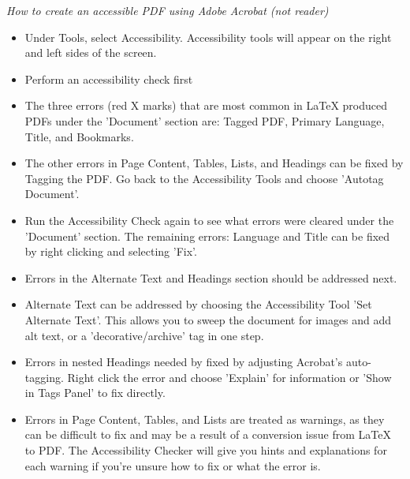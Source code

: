 \begin{titlepage}
\emph{How to create an accessible PDF using Adobe Acrobat (not reader) }
\begin{itemize}[nospace]
\item Under Tools, select Accessibility. Accessibility tools will appear on the right and left sides of the screen.
 \item Perform an accessibility check first
 \item The three errors (red X marks) that are most common in LaTeX produced PDFs under the 'Document' section are: Tagged PDF, Primary Language, Title, and Bookmarks.
 \item The other errors in Page Content, Tables, Lists, and Headings can be fixed by Tagging the PDF. Go back to the Accessibility Tools and choose 'Autotag Document'.
 \item Run the Accessibility Check again to see what errors were cleared under the 'Document' section. The remaining errors: Language and Title can be fixed by right clicking and selecting 'Fix'.
 \item Errors in the Alternate Text and Headings section should be addressed next. 
 \item Alternate Text can be addressed by choosing the Accessibility Tool 'Set Alternate Text'. This allows you to sweep the document for images and add alt text, or a 'decorative/archive' tag in one step.
 \item Errors in nested Headings needed by fixed by adjusting Acrobat's auto-tagging. Right click the error and choose 'Explain' for information or 'Show in Tags Panel' to fix directly.
 \item Errors in Page Content, Tables, and Lists are treated as warnings, as they can be difficult to fix and may be a result of a conversion issue from LaTeX to PDF. The Accessibility Checker will give you hints and explanations for each warning if you're unsure how to fix or what the error is.
\end{itemize}

 \end{titlepage}

 